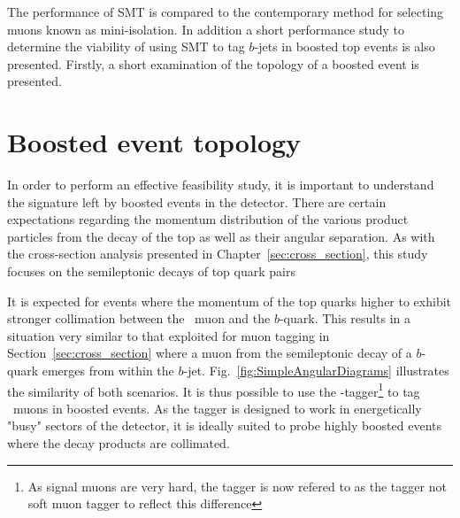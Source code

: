 The performance of SMT is compared to the contemporary method for selecting muons known as mini-isolation. In addition a short performance study to determine the viability of using SMT to tag $b$-jets in boosted top events is also presented. Firstly, a short examination of the topology of a boosted event is presented.

\section{Boosted event topology}

In order to perform an effective feasibility study, it is important to understand the signature left by boosted events in the detector. There are certain expectations regarding the momentum distribution of the various product particles from the decay of the top as well as their angular separation. As with the cross-section analysis presented in Chapter~\ref{sec:cross_section}, this study focuses on the semileptonic decays of top quark pairs

It is expected for events where the momentum of the top quarks higher to exhibit stronger collimation between the \W\ muon and the $b$-quark. This results in a situation very similar to that exploited for muon tagging in Section~\ref{sec:cross_section} where a muon from the semileptonic decay of a $b$-quark emerges from within the $b$-jet. Fig.~\ref{fig:SimpleAngularDiagrams} illustrates the similarity of both scenarios. It is thus possible to use the \xsm-tagger\footnote{As signal muons are very hard, the tagger is now refered to as the \xsm tagger not soft muon tagger to reflect this difference} to tag \W\ muons in boosted events. As the tagger is designed to work in energetically "busy" sectors of the detector, it is ideally suited to probe highly boosted events where the decay products are collimated.

